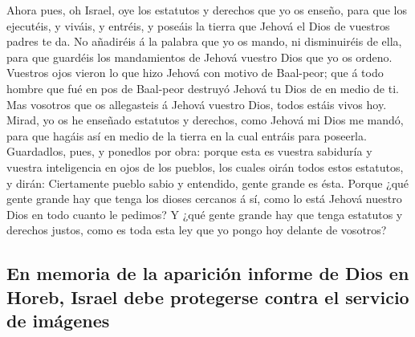  Ahora pues, oh Israel, oye los estatutos y derechos que yo
os enseño, para que los ejecutéis, y viváis, y entréis, y poseáis la
tierra que Jehová el Dios de vuestros padres te da.  No
añadiréis á la palabra que yo os mando, ni disminuiréis de ella, para
que guardéis los mandamientos de Jehová vuestro Dios que yo os ordeno.
 Vuestros ojos vieron lo que hizo Jehová con motivo de
Baal-peor; que á todo hombre que fué en pos de Baal-peor destruyó Jehová
tu Dios de en medio de ti.  Mas vosotros que os allegasteis
á Jehová vuestro Dios, todos estáis vivos hoy.  Mirad, yo os
he enseñado estatutos y derechos, como Jehová mi Dios me mandó, para que
hagáis así en medio de la tierra en la cual entráis para poseerla.
 Guardadlos, pues, y ponedlos por obra: porque esta es
vuestra sabiduría y vuestra inteligencia en ojos de los pueblos, los
cuales oirán todos estos estatutos, y dirán: Ciertamente pueblo sabio y
entendido, gente grande es ésta.  Porque ¿qué gente grande
hay que tenga los dioses cercanos á sí, como lo está Jehová nuestro Dios
en todo cuanto le pedimos?  Y ¿qué gente grande hay que
tenga estatutos y derechos justos, como es toda esta ley que yo pongo
hoy delante de vosotros?

\hypertarget{en-memoria-de-la-apariciuxf3n-informe-de-dios-en-horeb-israel-debe-protegerse-contra-el-servicio-de-imuxe1genes}{%
\subsection{En memoria de la aparición informe de Dios en Horeb, Israel
debe protegerse contra el servicio de
imágenes}\label{en-memoria-de-la-apariciuxf3n-informe-de-dios-en-horeb-israel-debe-protegerse-contra-el-servicio-de-imuxe1genes}}

